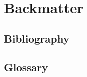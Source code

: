 \documentclass[letterpaper,table,10pt,english]{jupyterBook}
\begin{document}
\sphinxstepscope


\part{Backmatter}

\sphinxstepscope


\chapter{Bibliography}
\label{\detokenize{backmatter/bibliography:bibliography}}\label{\detokenize{backmatter/bibliography::doc}}\label{\detokenize{backmatter/bibliography:id1}}
\sphinxstepscope


\chapter{Glossary}
\end{document}
